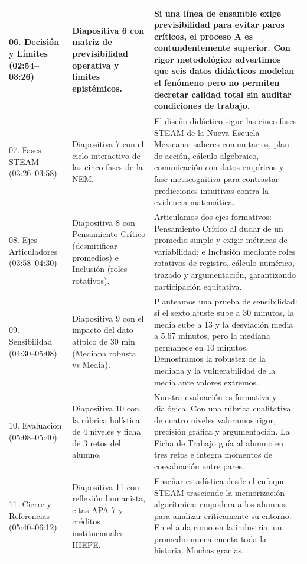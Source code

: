 \documentclass[spanish,letterpaper,oneside]{article}
\begin{document}
{\begin{longtable}{|p{2.2cm}|p{5.5cm}|p{6.8cm}|}
06. Decisión y Límites (02:54--03:26) & Diapositiva 6 con matriz de previsibilidad operativa y límites epistémicos. & Si una línea de ensamble exige previsibilidad para evitar paros críticos, el proceso A es contundentemente superior. Con rigor metodológico advertimos que seis datos didácticos modelan el fenómeno pero no permiten decretar calidad total sin auditar condiciones de trabajo. \\\hline
07. Fases STEAM (03:26--03:58) & Diapositiva 7 con el ciclo interactivo de las cinco fases de la NEM. & El diseño didáctico sigue las cinco fases STEAM de la Nueva Escuela Mexicana: saberes comunitarios, plan de acción, cálculo algebraico, comunicación con datos empíricos y fase metacognitiva para contrastar predicciones intuitivas contra la evidencia matemática. \\\hline
08. Ejes Articuladores (03:58--04:30) & Diapositiva 8 con Pensamiento Crítico (desmitificar promedios) e Inclusión (roles rotativos). & Articulamos dos ejes formativos: Pensamiento Crítico al dudar de un promedio simple y exigir métricas de variabilidad; e Inclusión mediante roles rotativos de registro, cálculo numérico, trazado y argumentación, garantizando participación equitativa. \\\hline
09. Sensibilidad (04:30--05:08) & Diapositiva 9 con el impacto del dato atípico de 30 min (Mediana robusta vs Media). & Planteamos una prueba de sensibilidad: si el sexto ajuste sube a 30 minutos, la media sube a 13 y la desviación media a 5.67 minutos, pero la mediana permanece en 10 minutos. Demostramos la robustez de la mediana y la vulnerabilidad de la media ante valores extremos. \\\hline
10. Evaluación (05:08--05:40) & Diapositiva 10 con la rúbrica holística de 4 niveles y ficha de 3 retos del alumno. & Nuestra evaluación es formativa y dialógica. Con una rúbrica cualitativa de cuatro niveles valoramos rigor, precisión gráfica y argumentación. La Ficha de Trabajo guía al alumno en tres retos e integra momentos de coevaluación entre pares. \\\hline
11. Cierre y Referencias (05:40--06:12) & Diapositiva 11 con reflexión humanista, citas APA 7 y créditos institucionales IIIEPE. & Enseñar estadística desde el enfoque STEAM trasciende la memorización algorítmica: empodera a los alumnos para analizar críticamente su entorno. En el aula como en la industria, un promedio nunca cuenta toda la historia. Muchas gracias. \\\hline
\end{longtable}}
\end{document}
